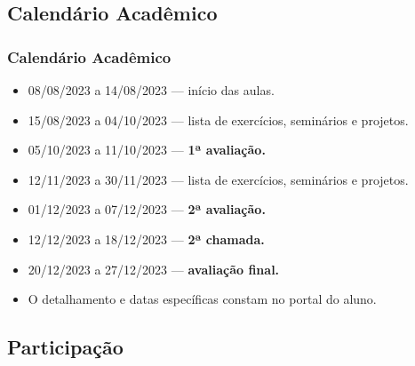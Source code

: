 \subsection[Calendário Acadêmico]{Calendário Acadêmico}\label{subsec:planejamento-calendario}



\begin{frame}[t]\frametitle{Calendário Acadêmico}

  \begin{itemize}
    \justifying{}
    \setlength\itemsep{1em}
    \item 08/08/2023 a 14/08/2023 --- início das aulas.
    \item 15/08/2023 a 04/10/2023 --- lista de exercícios, seminários e projetos.
    \item 05/10/2023 a 11/10/2023 --- \textbf{1ª avaliação.}
    \item 12/11/2023 a 30/11/2023 --- lista de exercícios, seminários e projetos.
    \item 01/12/2023 a 07/12/2023 --- \textbf{2ª avaliação.}
    \item 12/12/2023 a 18/12/2023 --- \textbf{2ª chamada.}
    \item 20/12/2023 a 27/12/2023 --- \textbf{avaliação final.}
    \item O detalhamento e datas específicas constam no portal do aluno.
  \end{itemize}

\end{frame}



\subsection[Participação]{Participação}\label{subsec:planejamento-participacao}



